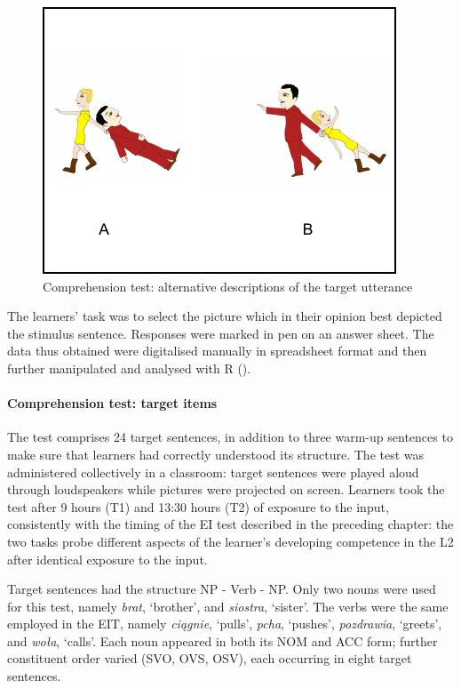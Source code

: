 \begin{figure}
    \includegraphics[width=\textwidth]{figures/02-7.pdf}
    \caption{Comprehension test: alternative descriptions of the target utterance}
    \label{fig:02:7}
\end{figure} 

The learners' task was to select the picture which in their opinion best depicted the stimulus sentence. Responses were marked in pen on an answer sheet. The data thus obtained were digitalised manually in spreadsheet format and then further manipulated and analysed with R (\citealt{RCoreTeam2017}).

\paragraph{Comprehension test: target items}

The test comprises 24 target sentences, in addition to three warm-up sentences to make sure that learners had correctly understood its structure. The test was administered collectively in a classroom: target sentences were played aloud through loudspeakers while pictures were projected on screen. Learners took the test after 9 hours (T1) and 13:30 hours (T2) of exposure to the input, consistently with the timing of the EI test described in the preceding chapter: the two tasks probe different aspects of the learner's developing competence in the L2 after identical exposure to the input.

Target sentences had the structure NP - Verb - NP. Only two nouns were used for this test, namely \textit{brat}, ‘brother’, and \textit{siostra}, ‘sister’. The verbs were the same employed in the EIT, namely \textit{ciągnie}, ‘pulls’,  \textit{pcha}, ‘pushes’, \textit{pozdrawia}, ‘greets’, and \textit{woła}, ‘calls’. Each noun appeared in both its NOM and ACC form; further constituent order varied (SVO, OVS, OSV), each occurring in eight target sentences. 

